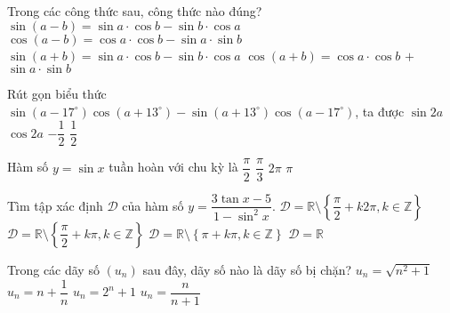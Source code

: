 \begin{ex}%
	Trong các công thức sau, công thức nào đúng?
	\choice
	{\True $\sin\left(a-b\right)=\sin a\cdot\cos b-\sin b\cdot\cos a$}
	{$\cos\left(a-b\right)=\cos a\cdot\cos b-\sin a\cdot\sin b$}
	{$\sin\left(a+b\right)=\sin a\cdot\cos b-\sin b\cdot\cos a$}
	{$\cos\left(a+b\right)=\cos a\cdot\cos b$ $+$ $\sin a\cdot\sin b$}
\end{ex}
\begin{ex}%
	Rút gọn biểu thức $\sin\left(a-17^\circ\right)\cos\left(a+13^\circ\right)-\sin\left(a+13^\circ\right)\cos\left(a-17^\circ\right)$, ta được
\choice
{$\sin2a$}
{$\cos2a$}
{\True $-\dfrac{1}{2}$}
{$\dfrac{1}{2}$}
\end{ex}
\begin{ex}%
	Hàm số $y=\sin x$ tuần hoàn với chu kỳ là 
	\choice
	{$\dfrac{\pi}{2}$}
	{$\dfrac{\pi}{3}$}
	{\True $2\pi$}
	{$\pi$}
\end{ex}
\begin{ex}%
	Tìm tập xác định $\mathscr{D}$ của hàm số $y=\dfrac{3\tan x-5}{1-\sin^2 x}$.
	\choice
	{$\mathscr{D}=\mathbb{R}\setminus\left\{\dfrac{\pi}{2}+k2\pi,k\in\mathbb{Z}\right\}$}
	{\True $\mathscr{D}=\mathbb{R}\setminus\left\{\dfrac{\pi}{2}+k\pi,k\in\mathbb{Z}\right\}$}
	{$\mathscr{D}=\mathbb{R}\setminus\left\{\pi+k\pi,k\in\mathbb{Z}\right\}$}
	{$\mathscr{D}=\mathbb{R}$}
\end{ex}

\begin{ex}%
	Trong các dãy số $\left(u_n\right)$ sau đây, dãy số nào là dãy số bị chặn?
	\choice
	{$u_n=\sqrt{n^2+1}$}
	{$u_n=n+\dfrac{1}{n}$}
	{$u_n=2^n+1$}
	{\True $u_n=\dfrac{n}{n+1}$}
\end{ex}

